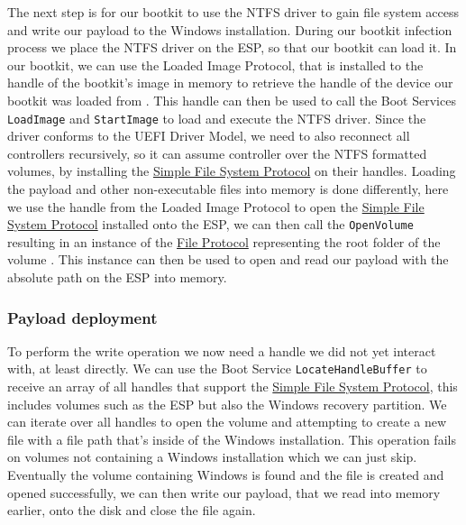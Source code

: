 The next step is for our bootkit to use the NTFS driver to gain file system access and write our payload to the Windows installation.
During our bootkit infection process we place the NTFS driver on the \ac{ESP}, so that our bootkit can load it.
In our bootkit, we can use the Loaded Image Protocol, that is installed to the handle of the bootkit's image in memory to retrieve the handle of the device our bootkit was loaded from \cite[9.1 EFI Loaded Image Protocol]{uefi-spec}.
This handle can then be used to call the Boot Services \lstinline{LoadImage} and \lstinline{StartImage} to load and execute the NTFS driver.
Since the driver conforms to the UEFI Driver Model, we need to also reconnect all controllers recursively, so it can assume controller over the NTFS formatted volumes, by installing the \hyperref[lst:simple-filesytem-protocol]{Simple File System Protocol} on their handles.
Loading the payload and other non-executable files into memory is done differently, here we use the handle from the Loaded Image Protocol to open the \hyperref[lst:simple-filesytem-protocol]{Simple File System Protocol} installed onto the \ac{ESP}, we can then call the \lstinline{OpenVolume} resulting in an instance of the \hyperref[lst:file-protocol]{File Protocol} representing the root folder of the volume \cite[13.4]{uefi-spec}.
This instance can then be used to open and read our payload with the absolute path on the \ac{ESP} into memory.

\subsubsection{Payload deployment}

To perform the write operation we now need a handle we did not yet interact with, at least directly.
We can use the Boot Service \lstinline{LocateHandleBuffer} to receive an array of all handles that support the \hyperref[lst:simple-filesytem-protocol]{Simple File System Protocol}, this includes volumes such as the \ac{ESP} but also the Windows recovery partition.
We can iterate over all handles to open the volume and attempting to create a new file with a file path that's inside of the Windows installation.
This operation fails on volumes not containing a Windows installation which we can just skip.
Eventually the volume containing Windows is found and the file is created and opened successfully, we can then write our payload, that we read into memory earlier, onto the disk and close the file again.

